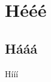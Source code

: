 \documentclass[a4paper,12pt]{article}
\begin{document}
\section{Hééé}

\subsection{Hááá}

Hííí
\end{document}
